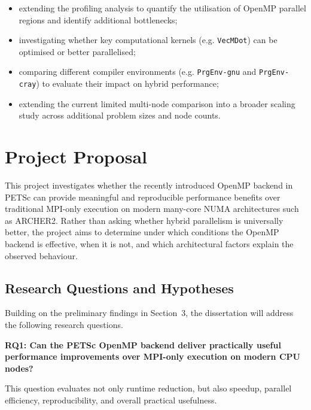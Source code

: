 \documentclass{article}
\begin{document}
\begin{itemize}
    \item extending the profiling analysis to quantify the utilisation of OpenMP parallel regions and identify additional bottlenecks;
    
    \item investigating whether key computational kernels (e.g. \texttt{VecMDot}) can be optimised or better parallelised;
    
    \item comparing different compiler environments (e.g. \texttt{PrgEnv-gnu} and \texttt{PrgEnv-cray}) to evaluate their impact on hybrid performance;
    
    \item extending the current limited multi-node comparison into a broader scaling study across additional problem sizes and node counts.
\end{itemize}

\section{Project Proposal}\label{s:proposal}

This project investigates whether the recently introduced OpenMP backend in PETSc 
can provide meaningful and reproducible performance benefits 
over traditional MPI-only execution on modern many-core NUMA architectures such as ARCHER2.
Rather than asking whether hybrid parallelism is universally better, 
the project aims to determine under which conditions the OpenMP backend is effective, 
when it is not, and which architectural factors explain the observed behaviour.

\subsection{Research Questions and Hypotheses}

Building on the preliminary findings in Section~3, 
the dissertation will address the following research questions.

\vspace{0.5em}

\noindent\textbf{RQ1: Can the PETSc OpenMP backend deliver practically useful performance improvements over MPI-only execution on modern CPU nodes?}

This question evaluates not only runtime reduction, but also speedup, parallel efficiency, reproducibility, and overall practical usefulness.
\end{document}
